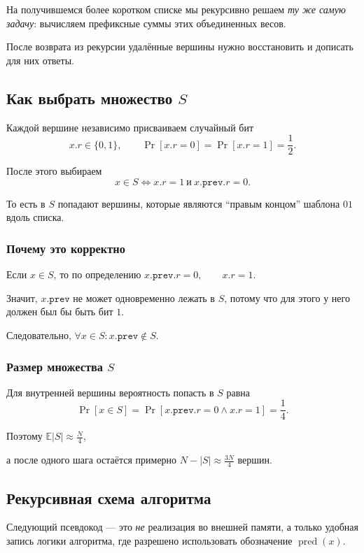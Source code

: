 	На получившемся более коротком списке мы рекурсивно решаем \emph{ту же самую задачу}: вычисляем префиксные суммы этих объединенных весов.
	
	После возврата из рекурсии удалённые вершины нужно восстановить и дописать для них ответы.
	
	
	\subsection{Как выбрать множество \(S\)}
	
	Каждой вершине независимо присваиваем случайный бит
	\[
	x.r\in\{0,1\},
	\qquad
	\Pr[x.r=0]=\Pr[x.r=1]=\frac12.
	\]
	
	После этого выбираем
	\[
	x\in S
	\iff
	x.r=1 \ \text{и}\ x.\texttt{prev}.r=0.
	\]
	
	То есть в $S$ попадают вершины, которые являются ``правым концом'' шаблона $01$ вдоль списка.
	
	\subsubsection*{Почему это корректно}
	
	Если $x\in S$, то по определению $x.\texttt{prev}.r=0,\qquad x.r=1$.

	Значит, $x.\texttt{prev}$ не может одновременно лежать в $S$, потому что для этого у него должен был бы быть бит $1$.
	
	Следовательно, $\forall x\in S\colon x.\texttt{prev}\notin S$.

	
	\subsubsection*{Размер множества $S$}
	
	Для внутренней вершины вероятность попасть в $S$ равна
	\[
	\Pr[x\in S]=\Pr[x.\texttt{prev}.r=0 \land x.r=1]=\frac14.
	\]
	
	Поэтому $\mathbb{E}|S| \approx \frac{N}{4}$,

	а после одного шага остаётся примерно $N-|S| \approx \frac{3N}{4}$
	вершин.
	
	\subsection{Рекурсивная схема алгоритма}
	
	Следующий псевдокод --- это \emph{не} реализация во внешней памяти, а только удобная запись логики алгоритма, где разрешено использовать обозначение $\operatorname{pred}(x)$.
	
